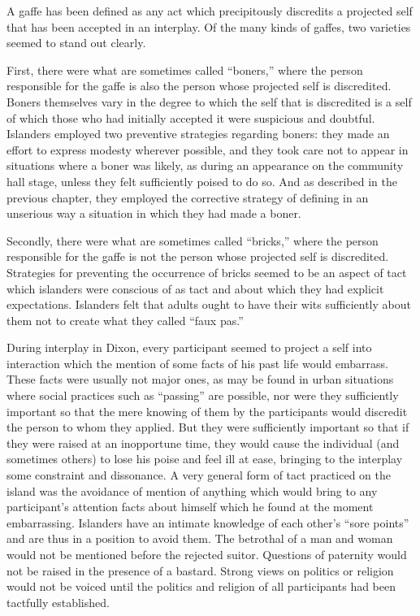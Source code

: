 \documentclass[twoside,symmetric,nobib,justified]{tufte-book}
\begin{document}
A gaffe has been defined as any act which precipitously discredits a
projected self that has been accepted in an interplay. Of the many kinds
of gaffes, two varieties seemed to stand out clearly.

First, there were what are sometimes called ``boners,'' where the person
responsible for the gaffe is also the person whose projected self is
discredited. Boners themselves vary in the degree to which the self that
is discredited is a self of which those who had initially accepted it
were suspicious and doubtful. Islanders employed two preventive
strategies regarding boners: they made an effort to express modesty
wherever possible, and they took care not to appear in situations where
a boner was likely, as during an appearance on the community hall stage,
unless they felt sufficiently poised to do so. And as described in the
previous chapter, they employed the corrective strategy of defining in
an unserious way a situation in which they had made a boner.

Secondly, there were what are sometimes called ``bricks,'' where the
person responsible for the gaffe is not the person whose projected self
is discredited. Strategies for preventing the occurrence of bricks
seemed to be an aspect of tact which islanders were conscious of as tact
and about which they had explicit expectations. Islanders felt that
adults ought to have their wits sufficiently about them not to create
what they called ``faux pas.''

During interplay in Dixon, every participant seemed to project a self
into interaction which the mention of some facts of his past life would
embarrass. These facts were usually not major ones, as may be found in
urban situations where social practices such as ``passing'' are
possible, nor were they sufficiently important so that the mere knowing
of them by the participants would discredit the person to whom they
applied. But they were sufficiently important so that if they were
raised at an inopportune time, they would cause the individual (and
sometimes others) to lose his poise and feel ill at ease, bringing to
the interplay some constraint and dissonance. A very general form of
tact practiced on the island was the avoidance of mention of anything
which would bring to any participant's attention facts about himself
which he found at the moment embarrassing. Islanders have an intimate
knowledge of each other's ``sore points'' and are thus in a position to
avoid them. The betrothal of a man and woman would not be mentioned
before the rejected suitor. Questions of paternity would not be raised
in the presence of a bastard. Strong views on politics or religion would
not be voiced until the politics and religion of all participants had
been tactfully established.
\end{document}
